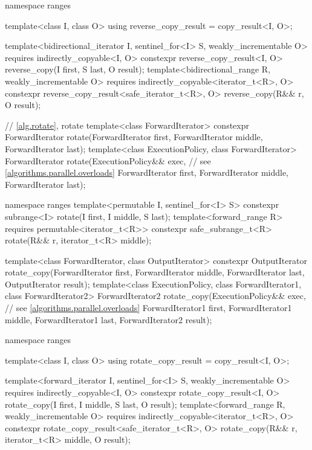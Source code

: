 \begin{codeblock}
{  namespace ranges {
    template<class I, class O>
    using reverse_copy_result = copy_result<I, O>;

    template<bidirectional_iterator I, sentinel_for<I> S, weakly_incrementable O>
      requires indirectly_copyable<I, O>
      constexpr reverse_copy_result<I, O>
        reverse_copy(I first, S last, O result);
    template<bidirectional_range R, weakly_incrementable O>
      requires indirectly_copyable<iterator_t<R>, O>
      constexpr reverse_copy_result<safe_iterator_t<R>, O>
        reverse_copy(R&& r, O result);
  }

  // \ref{alg.rotate}, rotate
  template<class ForwardIterator>
    constexpr ForwardIterator rotate(ForwardIterator first,
                                     ForwardIterator middle,
                                     ForwardIterator last);
  template<class ExecutionPolicy, class ForwardIterator>
    ForwardIterator rotate(ExecutionPolicy&& exec,              // see \ref{algorithms.parallel.overloads}
                           ForwardIterator first,
                           ForwardIterator middle,
                           ForwardIterator last);

  namespace ranges {
    template<permutable I, sentinel_for<I> S>
      constexpr subrange<I> rotate(I first, I middle, S last);
    template<forward_range R>
      requires permutable<iterator_t<R>>
      constexpr safe_subrange_t<R> rotate(R&& r, iterator_t<R> middle);
  }

  template<class ForwardIterator, class OutputIterator>
    constexpr OutputIterator
      rotate_copy(ForwardIterator first, ForwardIterator middle,
                  ForwardIterator last, OutputIterator result);
  template<class ExecutionPolicy, class ForwardIterator1, class ForwardIterator2>
    ForwardIterator2
      rotate_copy(ExecutionPolicy&& exec,                       // see \ref{algorithms.parallel.overloads}
                  ForwardIterator1 first, ForwardIterator1 middle,
                  ForwardIterator1 last, ForwardIterator2 result);

  namespace ranges {
    template<class I, class O>
    using rotate_copy_result = copy_result<I, O>;

    template<forward_iterator I, sentinel_for<I> S, weakly_incrementable O>
      requires indirectly_copyable<I, O>
      constexpr rotate_copy_result<I, O>
        rotate_copy(I first, I middle, S last, O result);
    template<forward_range R, weakly_incrementable O>
      requires indirectly_copyable<iterator_t<R>, O>
      constexpr rotate_copy_result<safe_iterator_t<R>, O>
        rotate_copy(R&& r, iterator_t<R> middle, O result);
  }

}
\end{codeblock}
